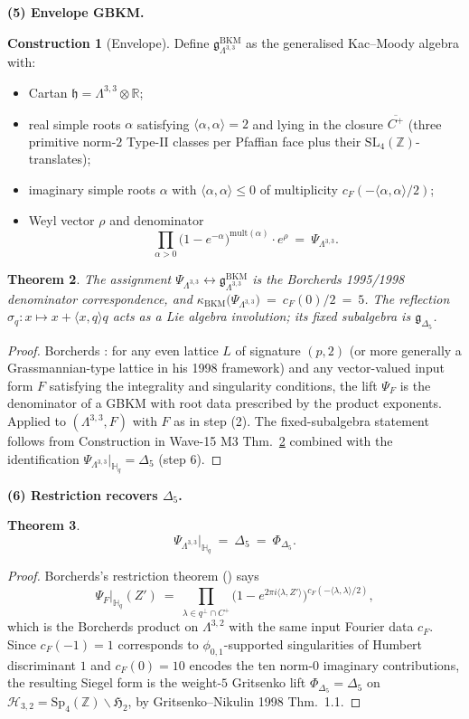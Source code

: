 \documentclass[11pt]{article}
\providecommand{\Lat}{\Lambda}
\providecommand{\Z}{\mathbb{Z}}
\providecommand{\R}{\mathbb{R}}
\providecommand{\HH}{\mathbb{H}}
\providecommand{\cH}{\mathcal{H}}
\providecommand{\gBKM}{\mathfrak{g}}
\providecommand{\SL}{\mathrm{SL}}
\providecommand{\Sp}{\mathrm{Sp}}
\providecommand{\kBKM}{\kappa_{\mathrm{BKM}}}
\providecommand{\Delfive}{\Delta_{5}}
\theoremstyle{plain}
\newtheorem{theorem}{Theorem}
\theoremstyle{definition}
\newtheorem{construction}[theorem]{Construction}
\begin{document}
\textbf{(5) Envelope GBKM.}
\begin{construction}[Envelope]\label{cons:envelope}
Define $\gBKM^{\mathrm{BKM}}_{\Lat^{3,3}}$ as the generalised
Kac--Moody algebra with:
\begin{itemize}
\item Cartan $\mathfrak{h}=\Lat^{3,3}\otimes\R$;
\item real simple roots $\alpha$ satisfying $\langle\alpha,\alpha\rangle
=2$ and lying in the closure $\overline{C^+}$ (three primitive norm-$2$
Type-II classes per Pfaffian face plus their $\SL_4(\Z)$-translates);
\item imaginary simple roots $\alpha$ with $\langle\alpha,\alpha\rangle
\le 0$ of multiplicity $c_F(-\langle\alpha,\alpha\rangle/2)$;
\item Weyl vector $\rho$ and denominator
\[
\prod_{\alpha>0}\bigl(1-e^{-\alpha}\bigr)^{\mathrm{mult}(\alpha)}
\cdot e^{\rho}\ =\ \Psi_{\Lat^{3,3}}.
\]
\end{itemize}
\end{construction}

\begin{theorem}\label{thm:envelope}
The assignment $\Psi_{\Lat^{3,3}}\leftrightarrow
\gBKM^{\mathrm{BKM}}_{\Lat^{3,3}}$ is the Borcherds 1995/1998
denominator correspondence, and
$\kBKM\bigl(\Psi_{\Lat^{3,3}}\bigr)\ =\ c_F(0)/2\ =\ 5$.
The reflection $\sigma_q:x\mapsto x+\langle x,q\rangle q$ acts as a Lie
algebra involution; its fixed subalgebra is $\gBKM_{\Delfive}$.
\end{theorem}
\begin{proof}
Borcherds \cite{Bor95,Bor98}: for any even lattice $L$ of signature
$(p,2)$ (or more generally a Grassmannian-type lattice in his 1998
framework) and any vector-valued input form $F$ satisfying the
integrality and singularity conditions, the lift $\Psi_F$ is the
denominator of a GBKM with root data prescribed by the product
exponents. Applied to $(\Lat^{3,3},F)$ with $F$ as in step (2).
The fixed-subalgebra statement follows from Construction in Wave-15 M3
Thm.~\ref{thm:envelope} combined with the identification
$\Psi_{\Lat^{3,3}}|_{\HH_q}=\Delfive$ (step 6).
\end{proof}

\textbf{(6) Restriction recovers $\Delfive$.}
\begin{theorem}\label{thm:restriction-recovers}
\[
\Psi_{\Lat^{3,3}}\big|_{\HH_q}\ =\ \Delfive\ =\ \Phi_{\Delfive}.
\]
\end{theorem}
\begin{proof}
Borcherds's restriction theorem (\cite[Thm.~8.1]{Bor98}) says
\[
\Psi_F\big|_{\HH_q}(Z')\ =\ \prod_{\lambda\in q^\perp\cap C^+}
\bigl(1-e^{2\pi i\langle\lambda,Z'\rangle}\bigr)^{c_F(-\langle\lambda,\lambda\rangle/2)},
\]
which is the Borcherds product on $\Lat^{3,2}$ with the same input
Fourier data $c_F$. Since $c_F(-1)=1$ corresponds to
$\phi_{0,1}$-supported singularities of Humbert discriminant $1$ and
$c_F(0)=10$ encodes the ten norm-$0$ imaginary contributions, the
resulting Siegel form is the weight-$5$ Gritsenko lift
$\Phi_{\Delfive}=\Delfive$ on $\cH_{3,2}=\Sp_4(\Z)\backslash
\mathfrak{H}_2$, by Gritsenko--Nikulin 1998 Thm.~1.1.
\end{proof}
\end{document}
